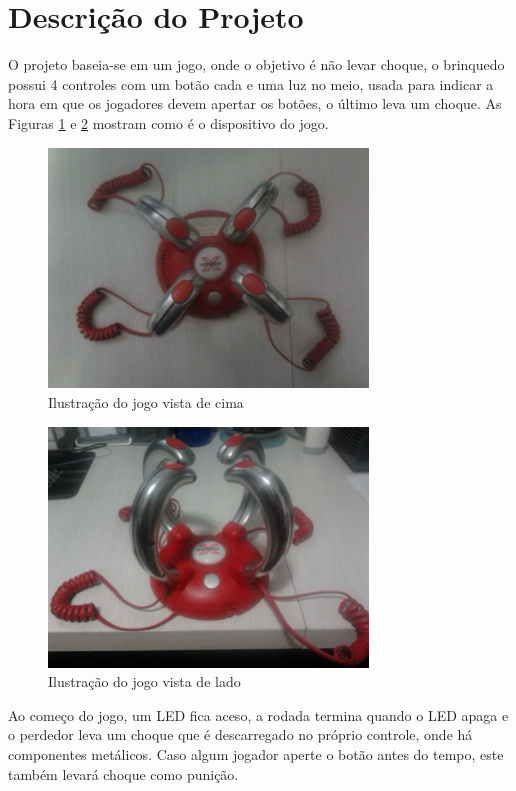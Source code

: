 \documentclass[article]{IEEEtran}
\begin{document}
\section{Descrição do Projeto}
O projeto baseia-se em um jogo, onde o objetivo é não levar choque, o brinquedo possui 4 controles com um botão cada e uma luz no meio, usada para indicar a hora em que os jogadores devem apertar os botões, o último leva um choque. As Figuras \ref{fig:jogochoque1} e \ref{fig:jogochoque2} mostram como é o dispositivo do jogo.

	\begin{figure}	
		\centering
		\includegraphics[width=8.5cm]{./dispositivo1.png}
		\caption{Ilustração do jogo vista de cima}
 		\label{fig:jogochoque1}
	\end{figure}

	\begin{figure}	
		\centering
		\includegraphics[width=8.5cm]{./dispositivo2.png}
		\caption{Ilustração do jogo vista de lado}
 		\label{fig:jogochoque2}
	\end{figure}

Ao começo do jogo, um LED fica aceso, a rodada termina quando o LED apaga e o perdedor  leva um choque que é descarregado no próprio controle, onde há componentes metálicos. Caso algum jogador aperte o botão antes do tempo, este também levará choque como punição.
\end{document}
